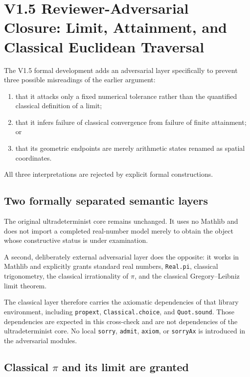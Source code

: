 \documentclass[11pt,a4paper]{article}
\begin{document}
\section{V1.5 Reviewer-Adversarial Closure:
Limit, Attainment, and Classical Euclidean Traversal}
\label{sec:v15-adversarial-closure}

The V1.5 formal development adds an adversarial layer specifically to
prevent three possible misreadings of the earlier argument:

\begin{enumerate}
\item that it attacks only a fixed numerical tolerance rather than the
      quantified classical definition of a limit;
\item that it infers failure of classical convergence from failure of
      finite attainment; or
\item that its geometric endpoints are merely arithmetic states
      renamed as spatial coordinates.
\end{enumerate}

All three interpretations are rejected by explicit formal
constructions.

\subsection{Two formally separated semantic layers}

The original ultradeterminist core remains unchanged.  It uses no
Mathlib and does not import a completed real-number model merely to
obtain the object whose constructive status is under examination.

A second, deliberately external adversarial layer does the opposite:
it works in Mathlib and explicitly grants standard real numbers,
\texttt{Real.pi}, classical trigonometry, the classical irrationality
of $\pi$, and the classical Gregory--Leibniz limit theorem.

The classical layer therefore carries the axiomatic dependencies of
that library environment, including
\texttt{propext}, \texttt{Classical.choice}, and
\texttt{Quot.sound}.  Those dependencies are expected in this
cross-check and are not dependencies of the ultradeterminist core.
No local \texttt{sorry}, \texttt{admit}, \texttt{axiom}, or
\texttt{sorryAx} is introduced in the adversarial modules.

\subsection{Classical $\pi$ and its limit are granted}
\end{document}

